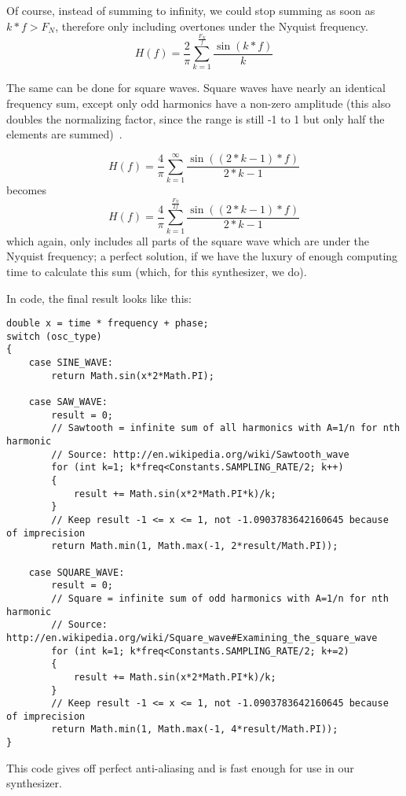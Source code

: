 \documentclass[11pt,a4paper]{article}
\begin{document}
Of course, instead of summing to infinity, we could stop summing as soon as \(k*f > F_N\), therefore only including overtones under the Nyquist frequency.
\begin{equation}
H(f) = \frac{2}{\pi}\sum\limits_{k=1}^\frac{F_N}{f}{\frac{\sin(k*f)}{k}}
\end{equation}

The same can be done for square waves. Square waves have nearly an identical frequency sum, except only odd harmonics have a non-zero amplitude (this also doubles the normalizing factor, since the range is still -1 to 1 but only half the elements are summed)~\cite{WolframSquare}.

\begin{equation}
H(f) = \frac{4}{\pi}\sum\limits_{k=1}^\infty{\frac{\sin((2*k-1)*f)}{2*k-1}}
\end{equation}
becomes
\begin{equation}
H(f) = \frac{4}{\pi}\sum\limits_{k=1}^\frac{F_N}{2f}{\frac{\sin((2*k-1)*f)}{2*k-1}}
\end{equation}
which again, only includes all parts of the square wave which are under the Nyquist frequency; a perfect solution, if we have the luxury of enough computing time to calculate this sum (which, for this synthesizer, we do).

In code, the final result looks like this:
\\\begin{minipage}{\linewidth}
\begin{lstlisting}
double x = time * frequency + phase;
switch (osc_type)
{
	case SINE_WAVE:
		return Math.sin(x*2*Math.PI);
	
	case SAW_WAVE:
		result = 0;
		// Sawtooth = infinite sum of all harmonics with A=1/n for nth harmonic
		// Source: http://en.wikipedia.org/wiki/Sawtooth_wave
		for (int k=1; k*freq<Constants.SAMPLING_RATE/2; k++)
		{
			result += Math.sin(x*2*Math.PI*k)/k;
		}
		// Keep result -1 <= x <= 1, not -1.0903783642160645 because of imprecision
		return Math.min(1, Math.max(-1, 2*result/Math.PI));
		
	case SQUARE_WAVE:
		result = 0;
		// Square = infinite sum of odd harmonics with A=1/n for nth harmonic
		// Source: http://en.wikipedia.org/wiki/Square_wave#Examining_the_square_wave
		for (int k=1; k*freq<Constants.SAMPLING_RATE/2; k+=2)
		{
			result += Math.sin(x*2*Math.PI*k)/k;
		}
		// Keep result -1 <= x <= 1, not -1.0903783642160645 because of imprecision
		return Math.min(1, Math.max(-1, 4*result/Math.PI));
}
\end{lstlisting}
\end{minipage}
This code gives off perfect anti-aliasing and is fast enough for use in our synthesizer.
\end{document}

